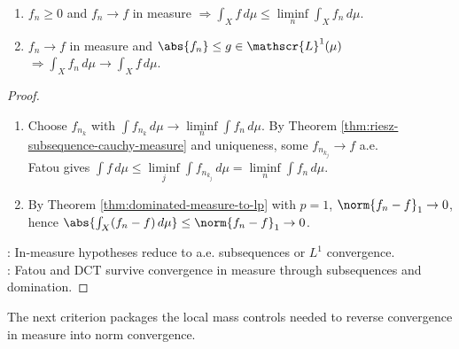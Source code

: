 \begin{corollary} \label{cor:fatou-and-dct-with-convergence-in-measure} 
\begin{enumerate}[label=(\roman*)]
\setlength{\itemsep}{0pt}
\item $f_n\geq0$ and $f_n\to f$ in measure $\Rightarrow \int_X f\,d\mu\leq\liminf\limits_n\int_Xf_n\,d\mu$.
\item $f_n\to f$ in measure and $\abs{f_n}\leq g\in\mathscr{L}^1(\mu)$ $\Rightarrow \int_Xf_n\,d\mu\to\int_Xf\,d\mu$.
\end{enumerate}
\begin{proof}
\begin{enumerate}[label=(\roman*)]
\setlength{\itemsep}{0pt}
\item Choose $f_{n_k}$ with $\int f_{n_k}\,d\mu\to\liminf\limits_n\int f_n\,d\mu$. By Theorem \ref{thm:riesz-subsequence-cauchy-measure} and uniqueness, some $f_{n_{k_j}}\to f$ a.e.\\
Fatou gives $\int f\,d\mu\leq\liminf\limits_j\int f_{n_{k_j}}\,d\mu=\liminf\limits_n\int f_n\,d\mu$.
\item By Theorem \ref{thm:dominated-measure-to-lp} with $p=1$, $\norm{f_n-f}_1\to0$, hence $\abs{\int_X(f_n-f)\,d\mu}\leq\norm{f_n-f}_1\to0$.
\end{enumerate}
: In-measure hypotheses reduce to a.e. subsequences or $L^1$ convergence.\\
: Fatou and DCT survive convergence in measure through subsequences and domination.
\end{proof}
\end{corollary}

The next criterion packages the local mass controls needed to reverse convergence in measure into norm convergence.


